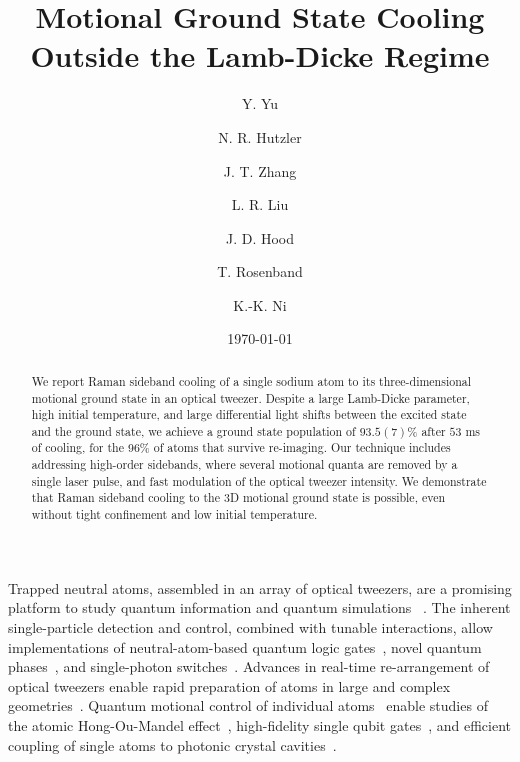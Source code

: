 \documentclass[aps,prl,twocolumn,groupedaddress]{revtex4-1}
\begin{document}
\title{Motional Ground State Cooling Outside the Lamb-Dicke Regime}
\author{Y. Yu}
\author{N. R. Hutzler}
\author{J. T. Zhang}
\author{L. R. Liu}
\author{J. D. Hood}
\author{T. Rosenband}
\author{K.-K. Ni}

\date{\today}

\begin{abstract}
  We report Raman sideband cooling of a single sodium atom to its three-dimensional
  motional ground state in an optical tweezer.
  Despite a large Lamb-Dicke parameter, high initial temperature, and
  large differential light shifts between the excited state and the ground state,
  we achieve a ground state population of $93.5(7)$\% after $53$ ms of cooling,
  for the 96\% of atoms that survive re-imaging. %
  Our technique includes addressing high-order sidebands,
  where several motional quanta are removed by a single laser pulse, and
  fast modulation of the optical tweezer intensity.
  We demonstrate that Raman sideband cooling to the 3D motional ground state is possible,
  even without tight confinement and low initial temperature.
\end{abstract}

\maketitle

Trapped neutral atoms, assembled in an array of optical tweezers,
are a promising platform to study quantum information and quantum simulations~
\cite{Schlosser2001,Weiss2004,Isenhower2010,Wilk2010,Kaufman2015,Labuhn2016,Murmann2015}.
The inherent single-particle detection and control, combined with tunable interactions,
allow implementations of neutral-atom-based quantum logic gates~\cite{Isenhower2010,Wilk2010},
novel quantum phases~\cite{Labuhn2016}, and single-photon switches~\cite{Dayan2008,Tiecke2014}.
Advances in real-time re-arrangement of optical tweezers enable rapid preparation of atoms
in large and complex geometries~\cite{Barredo2016,Endres2016}.
Quantum motional control of individual
atoms~\cite{Li2012,Kaufman2012,Thompson2013,Liu2017,Robens2017} enable
studies of the atomic Hong-Ou-Mandel effect~\cite{Kaufman2014},
high-fidelity single qubit gates~\cite{Wang2016},
and efficient coupling of single atoms to photonic crystal cavities~\cite{Thompson2013a}.
\end{document}
